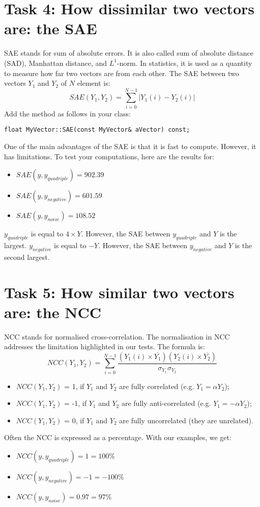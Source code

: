 \documentclass[english,a4paper,12pt,oneside]{article}
\begin{document}
\section*{Task 4: How dissimilar two vectors are: the SAE}

SAE stands for sum of absolute errors. It is also called sum of absolute distance (SAD), Manhattan distance, and $L^1$-norm.  
In statistics, it is used as a quantity to measure how far two vectors are from each other. 
The SAE between two vectors $Y_1$ and $Y_2$ of $N$ element is:
\begin{equation}
SAE(Y_1, Y_2) = \sum^{N-1}_{i=0} |Y_1(i)-Y_2(i)|
\end{equation}
Add the method as follows in your class:
\begin{lstlisting}
float MyVector::SAE(const MyVector& aVector) const;
\end{lstlisting}

One of the main advantages of the SAE is that it is fast to compute.  
However, it has limitations. 
To test your computations, here are the results for:
\begin{itemize}
\item $SAE(y, y_{quadriple}) =  902.39$
\item $SAE(y, y_{negative}) =  601.59$
\item $SAE(y, y_{noise}) =  108.52$
\end{itemize}
$y_{quadriple}$ is equal to $4 \times Y$. 
However, the SAE between $y_{quadriple}$ and $Y$ is the largest. 
$y_{negative}$ is equal to $-Y$. 
However, the SAE between $y_{negative}$ and $Y$ is the second largest. 

\section*{Task 5: How similar two vectors are: the NCC}

NCC stands for normalised cross-correlation. 
The normalisation in NCC addresses the limitation highlighted in our tests. 
The formula is:
\begin{equation}
NCC(Y_1, Y_2) = \sum^{N-1}_{i=0} \frac{(Y_1(i)\times\overline{Y_1})(Y_2(i)\times\overline{Y_2})}{\sigma_{Y_1}\sigma_{Y_2}}
\end{equation}
\begin{itemize}
\item $NCC(Y_1, Y_2)$ = 1, if $Y_1$ and $Y_2$ are fully correlated (e.g. $Y_1 = \alpha Y_2$);
\item $NCC(Y_1, Y_2)$ = -1, if $Y_1$ and $Y_2$ are fully anti-correlated (e.g. $Y_1 = -\alpha Y_2$);
\item $NCC(Y_1, Y_2)$ = 0, if $Y_1$ and $Y_2$ are fully uncorrelated (they are unrelated).
\end{itemize}
Often the NCC is expressed as a percentage. 
With our examples, we get:
\begin{itemize}
\item $NCC(y, y_{quadriple}) = 1 = 100\%$
\item $NCC(y, y_{negative}) = -1 = -100\%$
\item $NCC(y, y_{noise}) =  0.97 = 97\%$
\end{itemize}
\end{document}
